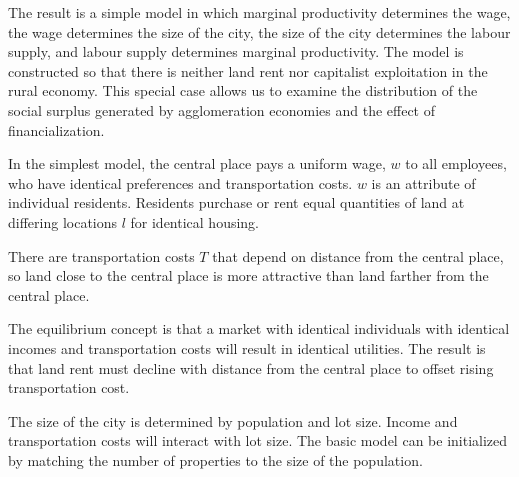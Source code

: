 
The result is a simple model in which marginal productivity determines the wage, the wage determines the size of the city, the size of the city determines the labour supply, and labour supply determines marginal productivity. 
The model is constructed so that there is neither land rent nor capitalist exploitation in the rural economy. 
This special case allows us to examine the distribution of the social surplus generated by agglomeration economies and the effect of financialization.

In the simplest model, the central place pays a uniform wage, $w$ to all employees, who have identical preferences and transportation costs. $w$ is an attribute of individual residents. Residents  purchase or rent equal quantities of land at differing locations $l$ for identical housing.  

There are transportation costs $T$ that depend on distance from the  central place, so land close to the central place is more attractive than land farther from the central place.  

The equilibrium concept is that a market with identical individuals with identical incomes and transportation costs will result in identical utilities. The result is that land rent must decline with distance from the central place to offset rising transportation cost. 

The size of the city is determined by population and lot size. Income and transportation costs will interact with lot size. The basic model can be initialized by matching the number of properties to the size of the population. 


